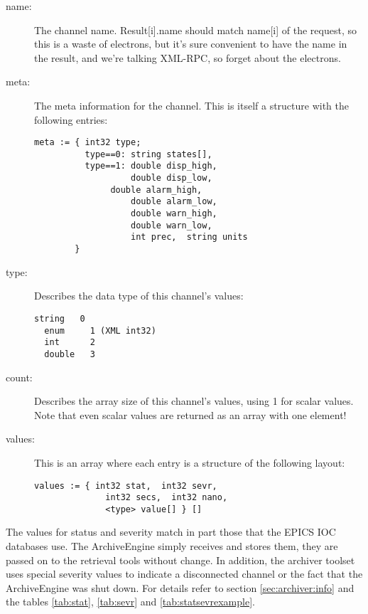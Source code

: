 \begin{description}
\item[\sffamily name:]
   The channel name.
   Result[i].name should match name[i] of the request, 
   so this is a waste of electrons,  but it's sure convenient
   to have the name in the result,  and we're talking XML-RPC,
   so forget about the electrons.
\item[\sffamily meta:]
   The meta information for the channel. This is itself a structure 
   with the following entries:
   \begin{lstlisting}[keywordstyle=\sffamily]
meta := { int32 type;
          type==0: string states[], 
          type==1: double disp_high, 
                   double disp_low, 
	           double alarm_high, 
                   double alarm_low, 
                   double warn_high, 
                   double warn_low, 
                   int prec,  string units
        }
   \end{lstlisting}
\item[\sffamily type:]
   Describes the data type of this channel's values:
  \begin{lstlisting}[frame=none, keywordstyle=\sffamily]
  string   0
  enum	   1 (XML int32)
  int      2
  double   3
  \end{lstlisting}
\item[\sffamily count:]
  Describes the array size of this channel's values,  using 1 for
  scalar values. Note that even scalar values are returned as an array
  with one element!
\item[\sffamily values:]
  This is an array where each entry is a structure of the following
  layout:
  \begin{lstlisting}[frame=none, keywordstyle=\sffamily]
  values := { int32 stat,  int32 sevr,
              int32 secs,  int32 nano,
              <type> value[] } []
  \end{lstlisting}
\end{description}

\noindent The values for status and severity match in part those that
the EPICS IOC databases use. The ArchiveEngine simply receives and
stores them, they are passed on to the retrieval tools without
change. In addition, the archiver toolset uses special severity values
to indicate a disconnected channel or the fact that the ArchiveEngine
was shut down.  For details refer to section \ref{sec:archiver:info}
and the tables \ref{tab:stat}, \ref{tab:sevr} and
\ref{tab:statsevrexample}.